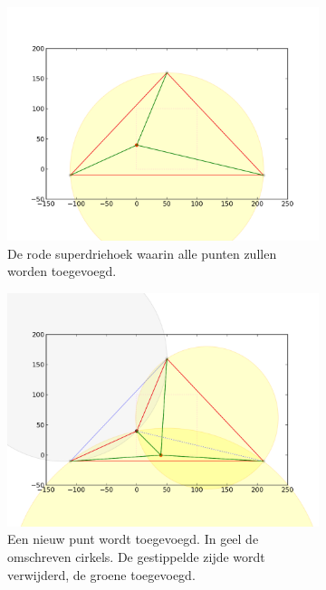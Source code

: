 \begin{figure}
	\center
	\begin{subfigure}{0.4\textwidth}
		\includegraphics[width=\textwidth]{img/bowyer-watson_superdriehoek}
		\caption{De rode superdriehoek waarin alle punten zullen worden toegevoegd.}
		\label{bowyer-watson-a}
	\end{subfigure}
	\begin{subfigure}{0.4\textwidth}
		\includegraphics[width=\textwidth]{img/bowyer-watson_nieuwpunt}
		\caption{Een nieuw punt wordt toegevoegd. In geel de omschreven cirkels. De gestippelde zijde wordt verwijderd, de groene toegevoegd.}
		\label{bowyer-watson-b}
	\end{subfigure}
		\begin{subfigure}{0.4\textwidth}

\end{subfigure}
\end{figure}
